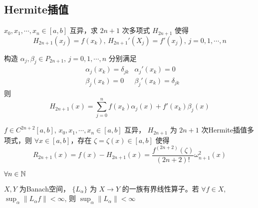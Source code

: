 \subsection{Hermite插值}
 $ x_0,x_1,\cdots,x_n\in [a,b] $ 互异，求 $ 2n+1 $ 次多项式 $ H_{2n+1} $ 使得
\[H_{2n+1}(x_j)=f(x_k),\,H_{2n+1}'(X_j)=f'(x_j),\,j=0,1,\cdots,n\] 

构造 $ \alpha_j,\beta_j\in P_{2n+1} $, $ j=0,1,\cdots,n $ 分别满足
\begin{align*}
    &\alpha_j(x_k)=\delta_{jk}&\alpha_j'(x_k)=0\\
    &\beta_j(x_k)=0&\beta_j'(x_k)=\delta_{jk}
\end{align*} 
则
\[H_{2n+1}(x)=\sum_{j=0}^nf(x_k)\alpha_j(x)+f'(x_k)\beta_j(x)\]
\begin{theorem}
    $ f\in C^{2n+2}[a,b] $,  $ x_0,x_1,\cdots,x_n\in [a,b] $ 互异， $ H_{2n+1} $ 为 $ 2n+1 $ 次Hermite插值多项式，则 $ \forall x\in [a,b] $，存在 $ \zeta=\zeta(x)\in [a,b] $  使得
    \[R_{2n+1}(x)=f(x)-H_{2n+1}(x)=\frac{f^{(2n+2)}(\zeta)}{(2n+2)!}\omega_{n+1}^2(x)\]     
\end{theorem}
\begin{theorem}
    $ \forall n\in \mathbb N $ 
\end{theorem}
\begin{theorem}
    $ X,Y $ 为Banach空间， $ \{L_\alpha\} $ 为 $ X\rightarrow Y $  的一族有界线性算子。若 $ \forall f\in X $,  $ \sup_{\alpha}\|L_\alpha f\|<\infty $, 则 $ \sup_\alpha\|L_\alpha\|<\infty $ 
\end{theorem}